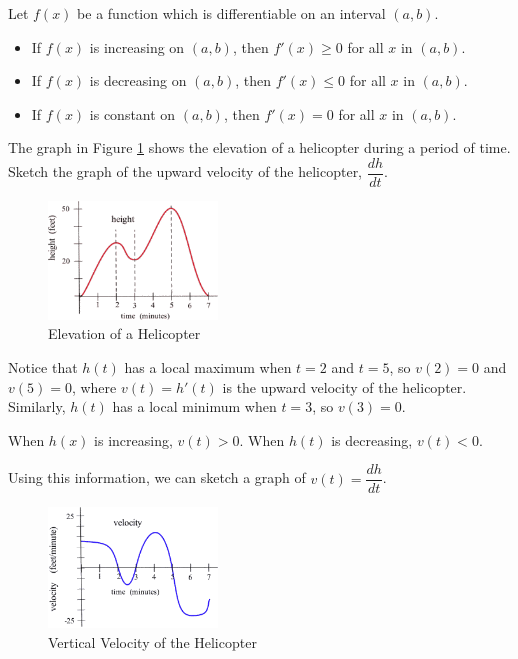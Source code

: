 \begin{theorem}
\label{thm:3-5-shape1}
Let $f(x)$ be a function which is differentiable on an interval $(a,b)$.
    \begin{itemize}
    \item If $f(x)$ is increasing on $(a,b)$, then $f'(x)\ge 0$ for all $x$ in $(a,b)$.
    \item If $f(x)$ is decreasing on $(a,b)$, then $f'(x)\le 0$ for all $x$ in $(a,b)$.
    \item If $f(x)$ is constant on $(a,b)$, then $f'(x)=0$ for all $x$ in $(a,b)$.
    \end{itemize}
\end{theorem}
\begin{example}
The graph in Figure \ref{fig:3-5-helicopter} shows the elevation of a helicopter during a period of time. Sketch the graph of the upward velocity of the helicopter, $\dfrac{dh}{dt}$.

\begin{figure}[!ht]
  \centering
    \includegraphics[width=0.4\textwidth]{img/chap3/image073.png}
    \caption{Elevation of a Helicopter}
    \label{fig:3-5-helicopter}
\end{figure}
\begin{solution} Notice that $h(t)$ has a local maximum when $t=2$ and $t=5$, so $v(2)=0$ and $v(5)=0$, where $v(t) = h'(t)$ is the upward velocity of the helicopter. Similarly, $h(t)$ has a local minimum when $t=3$, so $v(3)=0$.

When $h(x)$ is increasing, $v(t)>0$. When $h(t)$ is decreasing, $v(t)<0$.

Using this information, we can sketch a graph of $v(t)=\dfrac{dh}{dt}$.

\begin{figure}[!ht]
  \centering
    \includegraphics[width=0.4\textwidth]{img/chap3/image074.png}
    \caption{Vertical Velocity of the Helicopter}
    \label{fig:3-5-helicopterv}
\end{figure}
\end{solution}\end{example}

